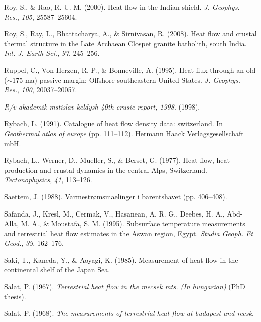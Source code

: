 \begin{CSLReferences}{1}{1}
\leavevmode{}%
Roy, S., \& Rao, R. U. M. (2000). Heat flow in the {Indian} shield. \emph{J. Geophys. Res.}, \emph{105}, 25587--25604.

\leavevmode{}%
Roy, S., Ray, L., Bhattacharya, A., \& Sirnivasan, R. (2008). Heat flow and crustal thermal structure in the {Late Archaean Clospet granite batholith, south India}. \emph{Int. J. Earth Sci.}, \emph{97}, 245--256.

\leavevmode{}%
Ruppel, C., Von Herzen, R. P., \& Bonneville, A. (1995). Heat flux through an old (\(\sim\)175 ma) passive margin: Offshore southeastern {United States}. \emph{J. Geophys. Res.}, \emph{100}, 20037--20057.

\leavevmode{}%
\emph{R/v akademik mstislav keldysh 40th crusie report, 1998}. (1998).

\leavevmode{}%
Rybach, L. (1991). Catalogue of heat flow density data: switzerland. In \emph{Geothermal atlas of europe} (pp. 111--112). Hermann Haack Verlagsgesellschaft mbH.

\leavevmode{}%
Rybach, L., Werner, D., Mueller, S., \& Berset, G. (1977). Heat flow, heat production and crustal dynamics in the central {Alps, Switzerland}. \emph{Tectonophysics}, \emph{41}, 113--126.

\leavevmode{}%
Saettem, J. (1988). Varmestrømsmaelinger i barentshavet (pp. 406--408).

\leavevmode{}%
Safanda, J., Kresl, M., Cermak, V., Hasanean, A. R. G., Deebes, H. A., Abd-Alla, M. A., \& Moustafa, S. M. (1995). Subsurface temperature measurements and terrestrial heat flow estimates in the {Aswan region, Egypt}. \emph{Studia Geoph. Et Geod.}, \emph{39}, 162--176.

\leavevmode{}%
Saki, T., Kaneda, Y., \& Aoyagi, K. (1985). Measurement of heat flow in the continental shelf of the {Japan Sea}.

\leavevmode{}%
Salat, P. (1967). \emph{Terrestrial heat flow in the mecsek mts. (In hungarian)} (PhD thesis).

\leavevmode{}%
Salat, P. (1968). \emph{The measurements of terrestrial heat flow at budapest and recsk}.


\end{CSLReferences}
